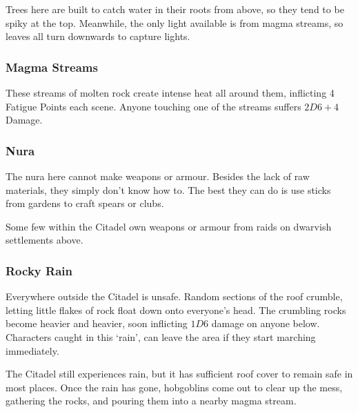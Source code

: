 \begin{multicols}{2}
Trees here are built to catch water in their roots from above, so they tend to be spiky at the top.  Meanwhile, the only light available is from magma streams, so leaves all turn downwards to capture lights.

\subsubsection{Magma Streams}

These streams of molten rock create intense heat all around them, inflicting 4 Fatigue Points each scene.
Anyone touching one of the streams suffers $2D6+4$ Damage.

\subsubsection{Nura}

The nura here cannot make weapons or armour.
Besides the lack of raw materials, they simply don't know how to.
The best they can do is use sticks from gardens to craft spears or clubs.

Some few within the Citadel own weapons or armour from raids on dwarvish settlements above.

\subsubsection{Rocky Rain}

Everywhere outside the Citadel is unsafe.
Random sections of the roof crumble, letting little flakes of rock float down onto everyone's head.
The crumbling rocks become heavier and heavier, soon inflicting $1D6$ damage on anyone below.
Characters caught in this `rain', can leave the area if they start marching immediately.

The Citadel still experiences rain, but it has sufficient roof cover to remain safe in most places.
Once the rain has gone, hobgoblins come out to clear up the mess, gathering the rocks, and pouring them into a nearby magma stream.


\end{multicols}

